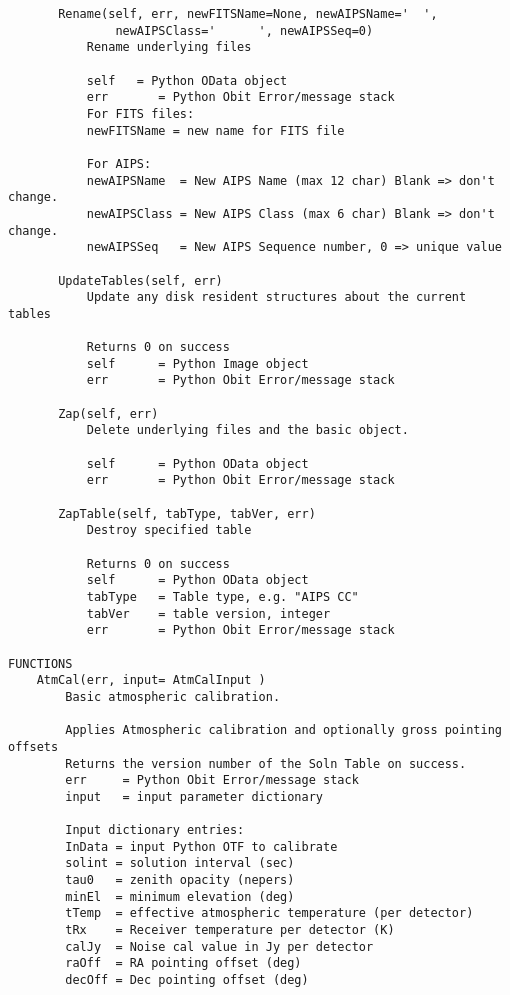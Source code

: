 \documentclass[11pt]{report}
\begin{document}
\begin{verbatim}
       Rename(self, err, newFITSName=None, newAIPSName='  ',
               newAIPSClass='      ', newAIPSSeq=0)
           Rename underlying files
           
           self   = Python OData object
           err       = Python Obit Error/message stack
           For FITS files:
           newFITSName = new name for FITS file
           
           For AIPS:
           newAIPSName  = New AIPS Name (max 12 char) Blank => don't change.
           newAIPSClass = New AIPS Class (max 6 char) Blank => don't change.
           newAIPSSeq   = New AIPS Sequence number, 0 => unique value
       
       UpdateTables(self, err)
           Update any disk resident structures about the current tables
           
           Returns 0 on success
           self      = Python Image object
           err       = Python Obit Error/message stack
       
       Zap(self, err)
           Delete underlying files and the basic object.
           
           self      = Python OData object
           err       = Python Obit Error/message stack
       
       ZapTable(self, tabType, tabVer, err)
           Destroy specified table
           
           Returns 0 on success
           self      = Python OData object
           tabType   = Table type, e.g. "AIPS CC"
           tabVer    = table version, integer
           err       = Python Obit Error/message stack

FUNCTIONS
    AtmCal(err, input= AtmCalInput )
        Basic atmospheric calibration.
        
        Applies Atmospheric calibration and optionally gross pointing offsets
        Returns the version number of the Soln Table on success.
        err     = Python Obit Error/message stack
        input   = input parameter dictionary
        
        Input dictionary entries:
        InData = input Python OTF to calibrate
        solint = solution interval (sec)
        tau0   = zenith opacity (nepers)
        minEl  = minimum elevation (deg)
        tTemp  = effective atmospheric temperature (per detector)
        tRx    = Receiver temperature per detector (K)
        calJy  = Noise cal value in Jy per detector
        raOff  = RA pointing offset (deg)
        decOff = Dec pointing offset (deg)
    

\end{verbatim}
\end{document}
